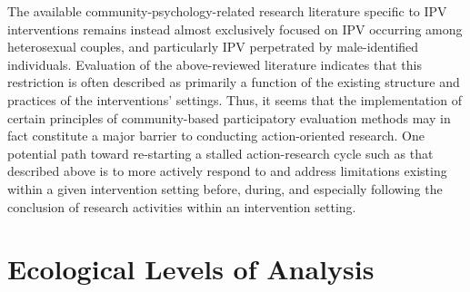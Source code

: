 \documentclass[11pt,]{tufte-book}
\begin{document}
The available community-psychology-related research literature specific
to IPV interventions remains instead almost exclusively focused on IPV
occurring among heterosexual couples, and particularly IPV perpetrated
by male-identified individuals. Evaluation of the above-reviewed
literature indicates that this restriction is often described as
primarily a function of the existing structure and practices of the
interventions' settings. Thus, it seems that the implementation of
certain principles of community-based participatory evaluation methods
may in fact constitute a major barrier to conducting action-oriented
research. One potential path toward re-starting a stalled
action-research cycle such as that described above is to more actively
respond to and address limitations existing within a given intervention
setting before, during, and especially following the conclusion of
research activities within an intervention setting.

\chapter{Ecological Levels of
Analysis}\label{ecological-levels-of-analysis}
\end{document}
